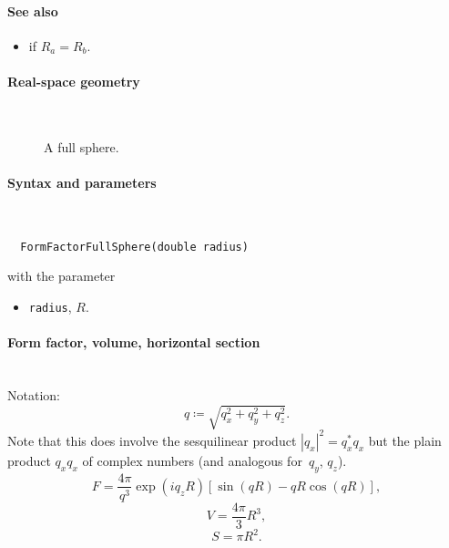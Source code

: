 \paragraph{See also}
\begin{itemize}
\item {} if $R_a=R_b$.
\end{itemize}


 \label{SFullSphere}

\paragraph{Real-space geometry}\strut\\

\begin{figure}[H]
\hfill
{}
\hfill
{}
\hfill
{}
\hfill
\caption{A full sphere.}
\end{figure}

\FloatBarrier

\paragraph{Syntax and parameters}\strut\\[-2ex plus .2ex minus .2ex]
\begin{lstlisting}
  FormFactorFullSphere(double radius)
\end{lstlisting}
with the parameter
\begin{itemize}
\item \texttt{radius}, $R$.
\end{itemize}

\paragraph{Form factor, volume, horizontal section}\strut\\
Notation:
\begin{equation*}
  q \coloneqq \sqrt{q_x^2+q_y^2+q_z^2}.
\end{equation*}
Note that this does  involve the sesquilinear product
$|q_x|^2=q_x^* q_x$ but the plain product $q_xq_x$ of complex numbers
(and analogous for~$q_y$, $q_z$).
\begin{equation*}
F = \frac{4\pi}{q^3} \exp(iq_z R)\left[\sin(qR) - qR \cos(qR)\right],
\end{equation*}
\begin{equation*}
  V = \dfrac{4\pi}{3}R^3,
\end{equation*}
\begin{equation*}
  S= \pi R^2.
\end{equation*}

